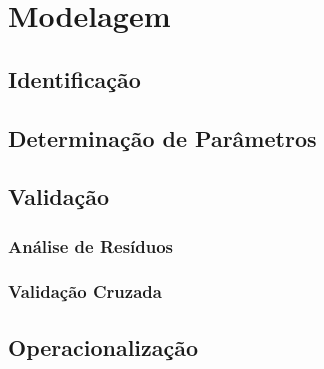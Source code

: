 \chapter{Modelagem}\label{chap:modelagem}

\section{Identificação}

\section{Determinação de Parâmetros}

\section{Validação}\label{sec:validacao}

\subsection{Análise de Resíduos}
\label{sec:residual_analysis}

\subsection{Validação Cruzada}

\section{Operacionalização}
